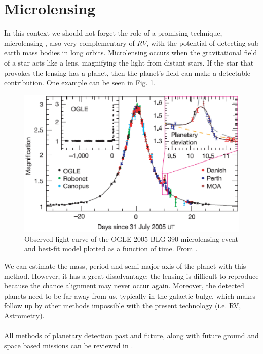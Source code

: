 \documentclass[dvips,12pt,a4paper]{report}
\begin{document}
\section{Microlensing} 
\label{microlens}
\indent In this context we should not forget the role of a promising technique, microlensing \citep{Beaulieu-2006}, also very complementary of $RV$, with the potential of detecting sub earth mass bodies in long orbits. Microlensing occurs when the gravitational field of a star acts like a lens, magnifying the light from distant stars. If the star that provokes the lensing has a planet, then the planet's field can make a detectable contribution. One example can be seen in Fig. \ref{microlensfig}. 
\begin{figure}[h]
\centering
\includegraphics[trim=0cm 0.5cm 0cm 0.5cm,clip,height=5 cm]{pics/microlensing2}
\caption[Example of a microlensing event]{Observed light curve of the OGLE-2005-BLG-390 microlensing event and best-fit model plotted as a function of time. From \citet{Beaulieu-2006}.}
\label{microlensfig}
\end{figure}

We can estimate the mass, period and semi major axis of the planet with this method. However, it has a great disadvantage: the lensing is difficult to reproduce because the chance alignment may never occur again. Moreover, the detected planets need to be far away from us, typically in the galactic bulge, which makes follow up by other methods impossible with the present technology (i.e. RV, Astrometry).
\\
\\
All methods of planetary detection past and future, along with future ground and space based missions can be reviewed in \citet{Perryman-2005}.



\end{document}
